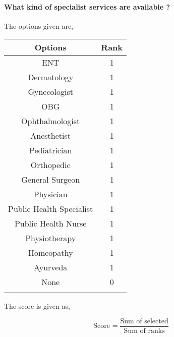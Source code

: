 \documentclass[oneside]{article}
\newcommand{\tsub}[2]{\text{#1}_{\text{#2}}}
\newcommand{\dsub}[2]{\dfrac{\text{#1}}{\text{#2}}}
\newcommand{\multsel}[1]
{
	\[
		\tsub{Score}{#1} = \dsub{Sum of selected}{Sum of ranks}
	\]
}
\newenvironment{ttable}
{
\begin{center}
\begin{tabular}{c|c}
\hline
}
{
\\ \hline
\end{tabular}
\end{center}
}
\begin{document}
\paragraph{ What kind of specialist services are available ?}
The options given are,
\begin{ttable}
Options & Rank \\ \hline
ENT & 1 \\
Dermatology & 1 \\
Gynecologist & 1 \\
OBG & 1 \\
Ophthalmologist & 1 \\
Anesthetist & 1 \\
Pediatrician & 1 \\
Orthopedic & 1 \\
General Surgeon & 1 \\
Physician & 1 \\
Public Health Specialist & 1 \\
Public Health Nurse & 1 \\
Physiotherapy & 1 \\
Homeopathy & 1 \\
Ayurveda & 1 \\
None & 0 \\
\hline
\end{ttable}
The score is given as,
\multsel{}
\end{document}
